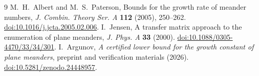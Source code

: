 \documentclass[11pt]{article}
\begin{document}
\begin{thebibliography}{9}\small
{} M.\ H.\ Albert and M.\ S.\ Paterson, Bounds for the growth rate of meander numbers, \emph{J. Combin. Theory Ser. A} \textbf{112} (2005), 250--262.
\href{https://doi.org/10.1016/j.jcta.2005.02.006}{doi:10.1016/j.jcta.2005.02.006}.
 I.\ Jensen, A transfer matrix approach to the enumeration of plane meanders, \emph{J. Phys. A} \textbf{33} (2000).
\href{https://doi.org/10.1088/0305-4470/33/34/301}{doi:10.1088/0305-4470/33/34/301}.
 I.\ Argunov, \emph{A certified lower bound for the growth constant of plane meanders}, preprint and verification materials (2026).
\href{https://doi.org/10.5281/zenodo.24448957}{doi:10.5281/zenodo.24448957}.
\end{thebibliography}
\end{document}
